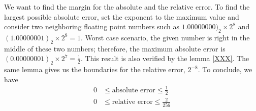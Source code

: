 \begin{exmp}
    We want to find the margin for the absolute and the relative error. To find the largest possible absolute error, set the exponent to the maximum value and consider two neighboring floating point numbers such as \(1.00000000)_2 \times 2^8\) and \((1.00000001)_2 \times 2^8 = 1\). Worst case scenario, the given number is right in the middle of these two numbers; therefore, the maximum absolute error is \((0.00000001)_2 \times 2^7 = \frac{1}{2}\). This result is also verified by the lemma \ref{XXX}. The same lemma gives us the boundaries for the relative error, \(2^{-8}\). To conclude, we have
    \begin{align*}
        0 &\leq \text{absolute error} \leq \frac{1}{2} \\
        0 &\leq \text{relative error} \leq \frac{2}{256}
    \end{align*}
\end{exmp}


